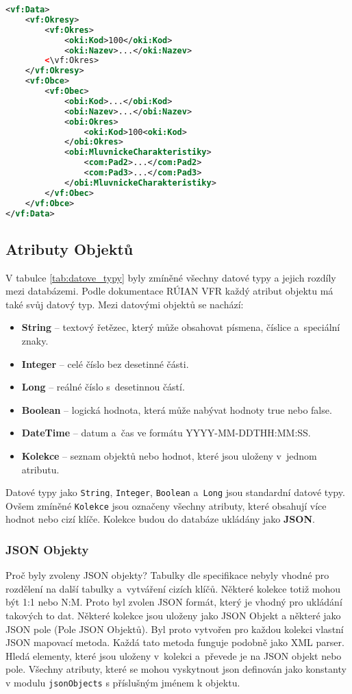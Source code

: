 \newpage

\begin{lstlisting}[language=xml, caption={Příklad Klasifikátorů}, label=lst:klasifikator]
<vf:Data>
    <vf:Okresy>
        <vf:Okres>
            <oki:Kod>100</oki:Kod>
            <oki:Nazev>...</oki:Nazev>
        <\vf:Okres>
    </vf:Okresy>
    <vf:Obce>
        <vf:Obec>
            <obi:Kod>...</obi:Kod>
            <obi:Nazev>...</obi:Nazev>
            <obi:Okres>
                <oki:Kod>100<oki:Kod>
            </obi:Okres>
            <obi:MluvnickeCharakteristiky>
                <com:Pad2>...</com:Pad2>
                <com:Pad3>...</com:Pad3>
            </obi:MluvnickeCharakteristiky>
        </vf:Obec>
    </vf:Obce>
</vf:Data>
\end{lstlisting}

\subsection{Atributy Objektů}
V tabulce \ref{tab:datove_typy} byly zmíněné všechny datové typy a jejich rozdíly mezi databázemi.
Podle dokumentace RÚIAN VFR \cite{ruian_vfr} každý atribut objektu má také svůj datový typ.
Mezi datovými objektů se nachází:
\begin{itemize}
    \item \textbf{String} -- textový řetězec, který může obsahovat písmena, číslice a~speciální znaky.
    \item \textbf{Integer} -- celé číslo bez desetinné části.
    \item \textbf{Long} -- reálné číslo s~desetinnou částí.
    \item \textbf{Boolean} -- logická hodnota, která může nabývat hodnoty true nebo false.
    \item \textbf{DateTime} -- datum a~čas ve formátu YYYY-MM-DDTHH:MM:SS.
    \item \textbf{Kolekce} -- seznam objektů nebo hodnot, které jsou uloženy v~jednom atributu.
\end{itemize}

Datové typy jako \texttt{String}, \texttt{Integer}, \texttt{Boolean} a~\texttt{Long} jsou standardní datové typy.
Ovšem zmíněné \texttt{Kolekce} jsou označeny všechny atributy, které obsahují více hodnot nebo cizí klíče.
Kolekce budou do databáze ukládány jako \textbf{JSON}.

\subsubsection*{JSON Objekty}
Proč byly zvoleny JSON objekty? Tabulky dle specifikace nebyly vhodné pro rozdělení na další tabulky a~vytváření cizích klíčů.
Některé kolekce totiž mohou být 1:1 nebo N:M. Proto byl zvolen JSON formát, který je vhodný pro ukládání takových to dat.
Některé kolekce jsou uloženy jako JSON Objekt a některé jako JSON pole (Pole JSON Objektů).
Byl proto vytvořen pro každou kolekci vlastní JSON mapovací metoda. Každá tato metoda funguje podobně jako XML parser.
Hledá elementy, které jsou uloženy v~kolekci a~převede je na JSON objekt nebo pole.
Všechny atributy, které se mohou vyskytnout json definován jako konstanty v modulu \texttt{jsonObjects} s příslušným jménem k objektu.

